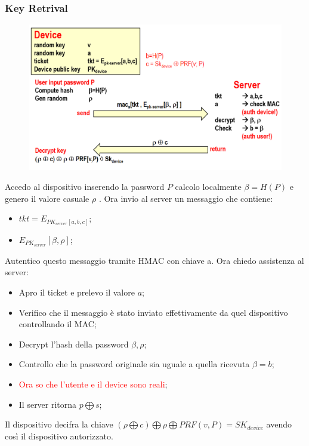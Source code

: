 \documentclass{book}
\begin{document}
    \subsubsection{Key Retrival}
    \begin{figure}[h]
        \centering
        \includegraphics[scale=0.4]{2022-01-06-17-06-20.png}%
    \end{figure}
Accedo al dispositivo inserendo la password \(P\) calcolo localmente \(\beta =H(P)\) e genero il valore casuale \(\rho \) \@. Ora invio al server un messaggio che contiene:\begin{itemize}
    \item \(tkt=E_{PK_{server}[a,b,c]}\);
    \item \(E_{PK_{server}}[\beta ,\rho ]\);
\end{itemize}
Autentico questo messaggio tramite HMAC con chiave a.\newline
Ora chiedo assistenza al server:\begin{itemize}
    \item Apro il ticket e prelevo il valore \(a\);
    \item Verifico che il messaggio è stato inviato effettivamente da quel dispositivo controllando il MAC\@;
    \item Decrypt l'hash della password \(\beta ,\rho \);
    \item Controllo che la password originale sia uguale a quella ricevuta \(\beta = b\);
    \item \textcolor{red}{Ora so che l'utente e il device sono reali};
    \item Il server ritorna \(p\bigoplus s\);
\end{itemize}
Il dispositivo decifra la chiave \((\rho \bigoplus c)\bigoplus \rho \bigoplus PRF(v,P)=SK_{device}\) avendo così il dispositivo autorizzato.
\end{document}
